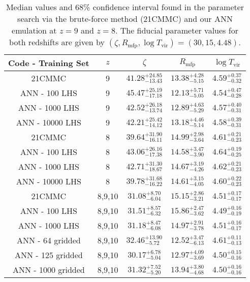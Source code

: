 \documentclass[useAMS,usenatbib]{mnras}
\begin{document}
\begin{table}
\begin{center}
\caption{Median values and 68\% confidence interval found in the parameter search via the brute-force method (21CMMC) and our ANN emulation at $z=9$ and $z = 8$. The fiducial parameter values for both redshifts are given by $(\zeta, R_\text{mfp}, \log T_\text{vir}) = (30,15,4.48)$.}
 \begin{tabular}{c @{\hskip 0.15cm} c @{\hskip 0.15cm} c @{\hskip 0.17cm} c @{\hskip 0.17cm} c} 
 \hline
 Code - Training Set & $z$ &$\zeta$ & $R_\text{mfp}$ & $\log T_\text{vir}$\\ [0.5ex] 
 \hline\hline
 21CMMC & 9 & $41.28^{+24.85}_{-13.43}$ & $13.38^{+4.28}_{-5.15}$ & $4.59^{+0.37}_{-0.32}$ \\ 
 \hline
 ANN - 100 LHS & 9 & $45.47^{+25.19}_{-17.18}$ & $12.13^{+5.71}_{-5.05}$ & $4.54^{+0.47}_{-0.28}$ \\
 \hline
 ANN - 1000 LHS & 9 & $42.52^{+26.18}_{-13.74}$ & $12.89^{+4.63}_{-5.29}$ & $4.57^{+0.40}_{-0.31}$ \\
 \hline
 ANN - 10000 LHS & 9 & $42.21^{+25.42}_{-14.12}$ & $13.18^{+4.46}_{-5.14}$ & $4.58^{+0.39}_{-0.31}$\\
 \hline\hline
 21CMMC & 8 & $39.64^{+31.90}_{-16.11}$ & $14.99^{+2.98}_{-3.64}$ & $4.61^{+0.21}_{-0.23}$\\ 
 \hline
 ANN - 100 LHS & 8 & $43.06^{+26.16}_{-17.38}$ & $14.58^{+3.47}_{-3.90}$ & $4.64^{+0.19}_{-0.25}$\\
 \hline
 ANN - 1000 LHS & 8 & $42.71^{+31.30}_{-18.67}$ & $14.67^{+3.19}_{-4.26}$ & $4.62^{+0.21}_{-0.23}$\\
 \hline
 ANN - 10000 LHS & 8 & $39.78^{+31.68}_{-16.22}$ & $14.61^{+3.15}_{-4.05}$ & $4.60^{+0.22}_{-0.23}$\\ 
 \hline\hline
 21CMMC & 8,9,10 & $31.08^{+8.70}_{-6.04}$ & $15.15^{+2.86}_{-3.21}$ & $4.51^{+0.17}_{-0.17}$ \\ \hline
 ANN - 100 LHS & 8,9,10 & $31.51^{+8.57}_{-6.32}$ & $15.86^{+2.47}_{-3.62}$ & $4.49^{+0.16}_{-0.19}$ \\ \hline
 ANN - 1000 LHS & 8,9,10 & $31.18^{+8.47}_{-6.08}$ & $14.97^{+2.91}_{-3.78}$ & $4.51^{+0.16}_{-0.17}$ \\ \hline
 ANN - 64 gridded & 8,9,10 & $32.46^{+13.90}_{-5.72}$ & $12.52^{+3.47}_{-6.13}$ & $4.61^{+0.11}_{-0.13}$ \\ \hline
 ANN - 125 gridded & 8,9,10 & $30.17^{+6.78}_{-5.04}$ & $12.97^{+4.09}_{-3.69}$ & $4.50^{+0.15}_{-0.16}$ \\ \hline
 ANN - 1000 gridded & 8,9,10 & $31.32^{+7.52}_{-5.20}$ & $13.94^{+3.80}_{-4.68}$ & $4.50^{+0.16}_{-0.16}$ \\ \hline
\end{tabular}
\label{table: statistics summary}
\end{center}


\end{table}
\end{document}
